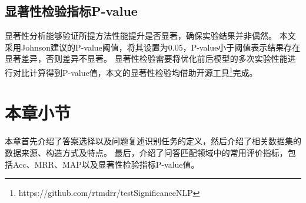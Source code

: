\subsection{显著性检验指标P-value}

显著性分析能够验证所提方法性能提升是否显著，确保实验结果并非偶然。
本文采用Johnson\cite{johnson1999insignificance}建议的P-value阈值，将其设置为0.05，P-value小于阈值表示结果存在显著差异，否则差异不显著。
显著性检验需要将优化前后模型的多次实验性能进行对比计算得到P-value值，本文的显著性检验均借助开源工具\footnote{https://github.com/rtmdrr/testSignificanceNLP}完成。

\section{本章小节}

本章首先介绍了答案选择以及问题复述识别任务的定义，然后介绍了相关数据集的数据来源、构造方式及特点。
最后，介绍了问答匹配领域中的常用评价指标，包括Acc、MRR、MAP以及显著性检验指标P-value值。